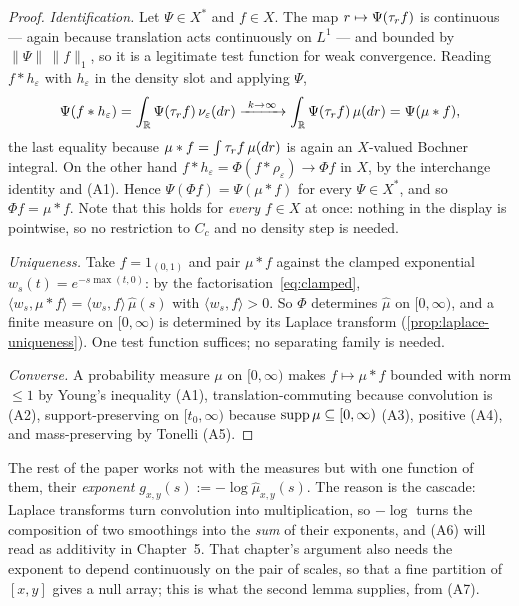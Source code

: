 \begin{proof}
\emph{Identification.} Let $\Psi \in X^*$ and $f \in X$. The map $r \mapsto \Psi(\tau_r f)$
is continuous --- again because translation acts continuously on $L^1$ --- and bounded by
$\|\Psi\|\,\|f\|_1$, so it is a legitimate test function for weak convergence. Reading
$f * h_\varepsilon$ with $h_\varepsilon$ in the density slot and applying $\Psi$,
\[
  \Psi(f * h_\varepsilon) = \int_{\mathbb{R}} \Psi(\tau_r f)\,\nu_\varepsilon(dr)
  \xrightarrow{\ k \to \infty\ } \int_{\mathbb{R}} \Psi(\tau_r f)\,\mu(dr) = \Psi(\mu * f),
\]
the last equality because $\mu * f = \int \tau_r f\,\mu(dr)$ is again an $X$-valued Bochner
integral. On the other hand $f * h_\varepsilon = \Phi(f * \rho_\varepsilon) \to \Phi f$ in $X$,
by the interchange identity and (A1). Hence $\Psi(\Phi f) = \Psi(\mu * f)$ for every
$\Psi \in X^*$, and so $\Phi f = \mu * f$. Note that this holds for \emph{every} $f \in X$ at
once: nothing in the display is pointwise, so no restriction to $C_c$ and no density step is
needed.

\emph{Uniqueness.} Take $f = 1_{(0,1)}$ and pair $\mu * f$ against the clamped
exponential $w_s(t) = e^{-s\max(t,0)}$: by the factorisation~\ref{eq:clamped},
$\langle w_s, \mu * f\rangle = \langle w_s, f\rangle\,\hat\mu(s)$ with
$\langle w_s, f\rangle > 0$. So $\Phi$ determines $\hat\mu$ on $[0,\infty)$, and a finite
measure on $[0,\infty)$ is determined by its Laplace transform
(\ref{prop:laplace-uniqueness}). One test function suffices; no separating
family is needed.

\emph{Converse.} A probability measure $\mu$ on $[0,\infty)$ makes $f \mapsto \mu * f$ bounded
with norm $\le 1$ by Young's inequality (A1), translation-commuting because convolution is
(A2), support-preserving on $[t_0,\infty)$ because $\operatorname{supp}\mu \subseteq [0,\infty)$ (A3),
positive (A4), and mass-preserving by Tonelli (A5).
\end{proof}

The rest of the paper works not with the measures but with one function of them, their
\emph{exponent} $g_{x,y}(s) := -\log\hat\mu_{x,y}(s)$. The reason is the cascade: Laplace
transforms turn convolution into multiplication, so $-\log$ turns the composition of two
smoothings into the \emph{sum} of their exponents, and (A6) will read as additivity in
Chapter~5. That chapter's argument also needs the exponent to depend continuously on the
pair of scales, so that a fine partition of $[x,y]$ gives a null array; this is what the
second lemma supplies, from (A7).

